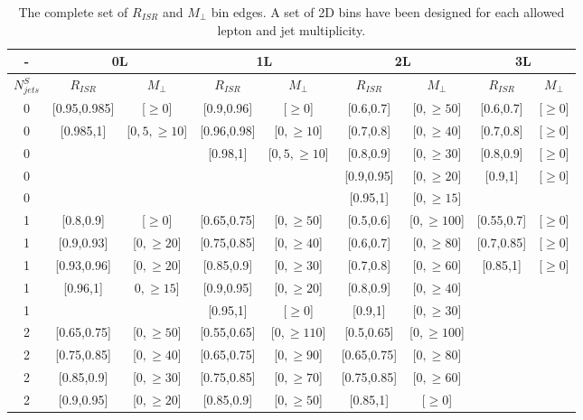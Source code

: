 \begin{table}
\caption{The complete set of $R_{ISR}$ and $M_\perp$ bin edges. A set of 2D bins have been designed for each allowed lepton and jet multiplicity.}
\begin{adjustwidth}{-0.5in}{-1in}
\begin{tabular}{c|cc|cc|cc|cc|}
- & \multicolumn{2}{c}{0L} & \multicolumn{2}{c}{1L} & \multicolumn{2}{c}{2L} & \multicolumn{2}{c}{3L}   \\
\hline
$N_{jets}^S$ & $R_{ISR}$ & $M_\perp$ & $R_{ISR}$ & $M_\perp$ & $R_{ISR}$ & $M_\perp$ & $R_{ISR}$ & $M_\perp$ \\
\hline
0 & [0.95,0.985] & [$\geq 0$]  &[0.9,0.96] & [$\geq 0$]  &[0.6,0.7] & [$0,\geq 50$]  &[0.6,0.7] & [$\geq 0$]  \\
0 & [0.985,1] & [$0,5,\geq 10$]  &[0.96,0.98] & [$0,\geq 10$]  & [0.7,0.8]  & [$0,\geq 40$] &[0.7,0.8] & [$\geq 0$]  \\
0 &  &  &[0.98,1] & [$0,5,\geq 10$]  &  [0.8,0.9]  & [$0,\geq 30$] &[0.8,0.9] & [$\geq 0$]  \\
0 &  &   &        &                &[0.9,0.95] &  [$0,\geq 20$]  &[0.9,1] & [$\geq 0$]  \\
0 &   &   &   &   & [0.95,1] & [$0,\geq 15$]  & &   \\
\hline
1 & [0.8,0.9] & [$\geq 0$]  &[0.65,0.75] & [$0,\geq 50$]  &[0.5,0.6] & [$0,\geq 100$]  &[0.55,0.7] & [$\geq 0$]  \\
1 & [0.9,0.93] & [$0,\geq 20$]  &[0.75,0.85] & [$0,\geq 40$]  &[0.6,0.7] & [$0,\geq 80$]  &[0.7,0.85] & [$\geq 0$]  \\
1 & [0.93,0.96] & [$0,\geq 20$]  & [0.85,0.9] & [$0,\geq 30$] &[0.7,0.8]  & [$0,\geq 60$]  &[0.85,1] & [$\geq 0$]  \\
1 & [0.96,1] & $0,\geq 15$]   &[0.9,0.95] & [$0,\geq 20$]   &[0.8,0.9] & [$0,\geq 40$]   & &   \\
1 &  &   &[0.95,1]   & [$\geq 0$]   &[0.9,1]& [$0,\geq 30$]   & &   \\
\hline
2 & [0.65,0.75] & [$0,\geq 50$]  &[0.55,0.65] & [$0,\geq 110$]  &[0.5,0.65] & [$0,\geq 100$]  & &   \\
2 & [0.75,0.85] & [$0,\geq 40$]  &[0.65,0.75] & [$0,\geq 90$]  &[0.65,0.75] & [$0,\geq 80$]  & &   \\
2 & [0.85,0.9] & [$0,\geq 30$]  &[0.75,0.85] & [$0,\geq 70$]  &[0.75,0.85] & [$0,\geq 60$]  & &   \\
2 & [0.9,0.95] & [$0,\geq 20$]  &[0.85,0.9] & [$0,\geq 50$]  &[0.85,1] & [$\geq 0$]  & &   \\

\end{tabular}
\end{adjustwidth}
\end{table}
